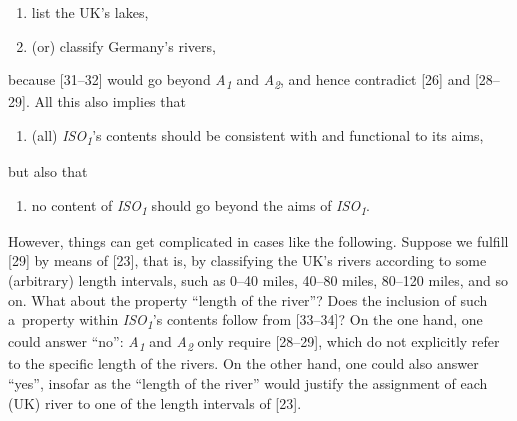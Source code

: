\setcounter{saveenum}{\value{enumi}}

\begin{enumerate}

\setcounter{enumi}{\value{saveenum}}

\item list the UK's lakes,

\item (or) classify Germany's rivers,

\end{enumerate}

because [31–32] would go beyond \textit{A}\textit{\textsubscript{1}} and \textit{A}\textit{\textsubscript{2}}, and hence contradict [26] and [28–29]. All this also implies that



\setcounter{saveenum}{\value{enumi}}

\begin{enumerate}

\setcounter{enumi}{\value{saveenum}}

\item (all) \textit{ISO}\textit{\textsubscript{1}}'s contents should be consistent with and functional to its aims,

\end{enumerate}

but also that



\setcounter{saveenum}{\value{enumi}}

\begin{enumerate}

\setcounter{enumi}{\value{saveenum}}

\item no content of \textit{ISO}\textit{\textsubscript{1}} should go beyond the aims of \textit{ISO}\textit{\textsubscript{1}}.

\end{enumerate}

However, things can get complicated in cases like the following. Suppose we fulfill [29] by means of [23], that is, by classifying the UK's rivers according to some (arbitrary) length intervals, such as 0–40 miles, 40–80 miles, 80–120 miles, and so on. What about the property ``length of the river''? Does the inclusion of such a~property within \textit{ISO}\textit{\textsubscript{1}}'s contents follow from [33–34]? On the one hand, one could answer ``no'': \textit{A}\textit{\textsubscript{1}} and \textit{A}\textit{\textsubscript{2}} only require [28–29], which do not explicitly refer to the specific length of the rivers. On the other hand, one could also answer ``yes'', insofar as the ``length of the river'' would justify the assignment of each (UK) river to one of the length intervals of [23].



